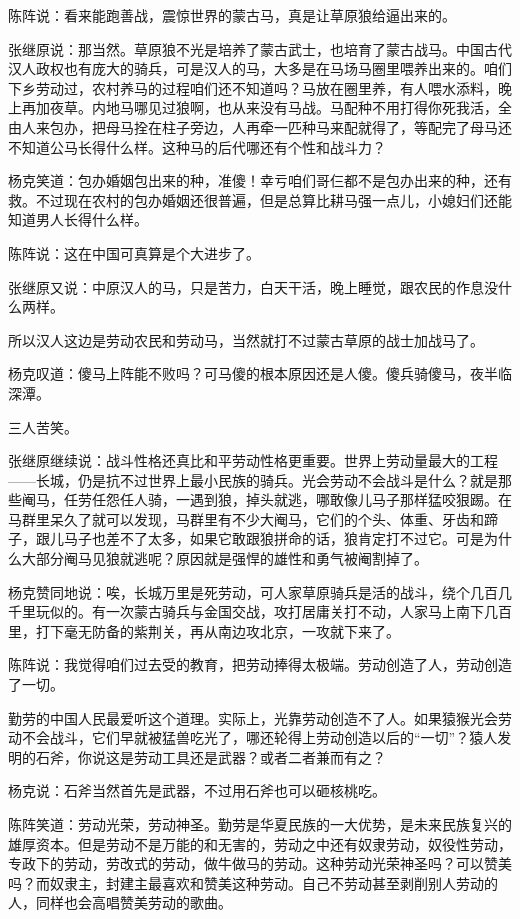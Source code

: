 \par 陈阵说：看来能跑善战，震惊世界的蒙古马，真是让草原狼给逼出来的。
\par 张继原说：那当然。草原狼不光是培养了蒙古武士，也培育了蒙古战马。中国古代汉人政权也有庞大的骑兵，可是汉人的马，大多是在马场马圈里喂养出来的。咱们下乡劳动过，农村养马的过程咱们还不知道吗？马放在圈里养，有人喂水添料，晚上再加夜草。内地马哪见过狼啊，也从来没有马战。马配种不用打得你死我活，全由人来包办，把母马拴在柱子旁边，人再牵一匹种马来配就得了，等配完了母马还不知道公马长得什么样。这种马的后代哪还有个性和战斗力？
\par 杨克笑道：包办婚姻包出来的种，准傻！幸亏咱们哥仨都不是包办出来的种，还有救。不过现在农村的包办婚姻还很普遍，但是总算比耕马强一点儿，小媳妇们还能知道男人长得什么样。
\par 陈阵说：这在中国可真算是个大进步了。
\par 张继原又说：中原汉人的马，只是苦力，白天干活，晚上睡觉，跟农民的作息没什么两样。
\par 所以汉人这边是劳动农民和劳动马，当然就打不过蒙古草原的战士加战马了。
\par 杨克叹道：傻马上阵能不败吗？可马傻的根本原因还是人傻。傻兵骑傻马，夜半临深潭。
\par 三人苦笑。
\par 张继原继续说：战斗性格还真比和平劳动性格更重要。世界上劳动量最大的工程——长城，仍是抗不过世界上最小民族的骑兵。光会劳动不会战斗是什么？就是那些阉马，任劳任怨任人骑，一遇到狼，掉头就逃，哪敢像儿马子那样猛咬狠踢。在马群里呆久了就可以发现，马群里有不少大阉马，它们的个头、体重、牙齿和蹄子，跟儿马子也差不了太多，如果它敢跟狼拼命的话，狼肯定打不过它。可是为什么大部分阉马见狼就逃呢？原因就是强悍的雄性和勇气被阉割掉了。
\par 杨克赞同地说：唉，长城万里是死劳动，可人家草原骑兵是活的战斗，绕个几百几千里玩似的。有一次蒙古骑兵与金国交战，攻打居庸关打不动，人家马上南下几百里，打下毫无防备的紫荆关，再从南边攻北京，一攻就下来了。
\par 陈阵说：我觉得咱们过去受的教育，把劳动捧得太极端。劳动创造了人，劳动创造了一切。
\par 勤劳的中国人民最爱听这个道理。实际上，光靠劳动创造不了人。如果猿猴光会劳动不会战斗，它们早就被猛兽吃光了，哪还轮得上劳动创造以后的“一切”？猿人发明的石斧，你说这是劳动工具还是武器？或者二者兼而有之？
\par 杨克说：石斧当然首先是武器，不过用石斧也可以砸核桃吃。
\par 陈阵笑道：劳动光荣，劳动神圣。勤劳是华夏民族的一大优势，是未来民族复兴的雄厚资本。但是劳动不是万能的和无害的，劳动之中还有奴隶劳动，奴役性劳动，专政下的劳动，劳改式的劳动，做牛做马的劳动。这种劳动光荣神圣吗？可以赞美吗？而奴隶主，封建主最喜欢和赞美这种劳动。自己不劳动甚至剥削别人劳动的人，同样也会高唱赞美劳动的歌曲。
